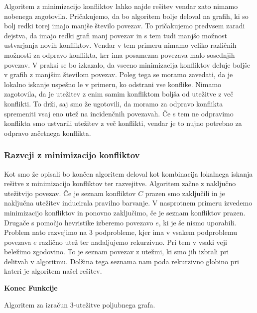 \documentclass[12pt,a4paper,twoside]{article}
\theoremstyle{definition} %
\theoremstyle{plain} %
\numberwithin{equation}{section}  %
\begin{document}
Algoritem z minimizacijo konfliktov lahko najde rešitev vendar zato nimamo nobenega zagotovila. Pričakujemo, da bo algoritem bolje deloval na grafih, ki so bolj redki torej imajo manjše število povezav. To pričakujemo predvsem zaradi dejstva, da imajo redki grafi manj povezav in s tem tudi manjšo možnost ustvarjanja novih konfliktov. Vendar v tem primeru nimamo veliko različnih možnosti za odpravo konflikta, ker ima posamezna povezava malo sosednjih povezav. V praksi se bo izkazalo, da vseeno minimizacija konfliktov deluje boljše v grafih z manjšim številom povezav. Poleg tega se moramo zavedati, da je lokalno iskanje uspešno le v primeru, ko odstrani vse konflike. Nimamo zagotovila, da je utežitev z enim samim konfliktom boljša od utežitve z več konflikti. To drži, saj smo že ugotovili, da moramo za odpravo konflikta spremeniti vsaj eno utež na incidenčnih povezavah. Če s tem ne odpravimo konflikta smo ustvarili utežitev z več konflikti, vendar je to nujno potrebno za odpravo začetnega konflikta.

\subsubsection{Razveji z minimizacijo konfliktov}

Kot smo že opisali bo končen algoritem deloval kot kombinacija lokalnega iskanja rešitve z minimizacijo konfliktov ter razvejitve. Algoritem začne z naključno utežitvijo povezav. Če je seznam konfliktov $C$ prazen smo zaključili in je naključna utežitev inducirala pravilno barvanje. V nasprotnem primeru izvedemo minimizacijo konfliktov in ponovno zaključimo, če je seznam konfliktov prazen. Drugače s pomočjo hevristike izberemo povezavo $e$, ki je še nismo uporabili. Problem nato razvejimo na $3$ podprobleme, kjer ima v vsakem podproblemu povezava $e$ različno utež ter nadaljujemo rekurzivno. Pri tem v vsaki veji beležimo zgodovino. To je seznam povezav z utežmi, ki smo jih izbrali pri delitvah v algoritmu. Dolžina tega seznama nam poda rekurzivno globino pri kateri je algoritem našel rešitev.

\begin{algorithm}[H]

\textbf{Konec Funkcije}



 
 \caption{Algoritem za izračun 3-utežitve poljubnega grafa.}
\end{algorithm}
\end{document}
